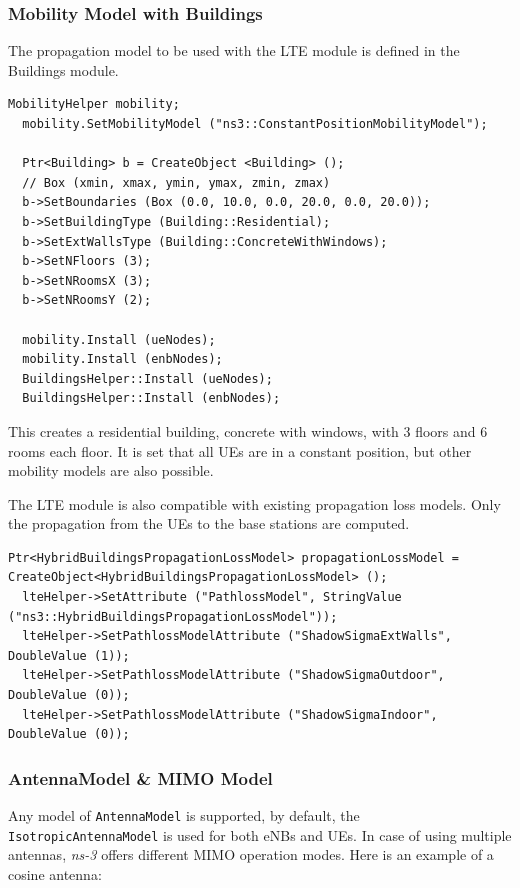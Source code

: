 \subsubsection{Mobility Model with Buildings}
The propagation model to be used with the LTE module is defined in the
Buildings module.

\begin{lstlisting}[language=myC++,caption={Mobility Model}, captionpos=b]
  MobilityHelper mobility;
  mobility.SetMobilityModel ("ns3::ConstantPositionMobilityModel");

  Ptr<Building> b = CreateObject <Building> ();
  // Box (xmin, xmax, ymin, ymax, zmin, zmax)
  b->SetBoundaries (Box (0.0, 10.0, 0.0, 20.0, 0.0, 20.0));
  b->SetBuildingType (Building::Residential);
  b->SetExtWallsType (Building::ConcreteWithWindows);
  b->SetNFloors (3);
  b->SetNRoomsX (3);
  b->SetNRoomsY (2);

  mobility.Install (ueNodes);
  mobility.Install (enbNodes);
  BuildingsHelper::Install (ueNodes);
  BuildingsHelper::Install (enbNodes);
\end{lstlisting}

This creates a residential building, concrete with windows, with 
3 floors and 6 rooms each floor. It is set that all UEs are in a 
constant position, but other mobility models are also possible.

The LTE module is also compatible with existing propagation loss models.
Only the propagation from the UEs to the base stations are computed.

\begin{lstlisting}[language=myC++,caption={Pathloss Model}, captionpos=b]
  Ptr<HybridBuildingsPropagationLossModel> propagationLossModel = CreateObject<HybridBuildingsPropagationLossModel> ();
  lteHelper->SetAttribute ("PathlossModel", StringValue ("ns3::HybridBuildingsPropagationLossModel"));
  lteHelper->SetPathlossModelAttribute ("ShadowSigmaExtWalls",   DoubleValue (1));
  lteHelper->SetPathlossModelAttribute ("ShadowSigmaOutdoor",    DoubleValue (0));
  lteHelper->SetPathlossModelAttribute ("ShadowSigmaIndoor",     DoubleValue (0));
\end{lstlisting}


\subsubsection{AntennaModel \& MIMO Model}
Any model of \texttt{AntennaModel} is supported, by default, the \texttt{IsotropicAntennaModel} is
used for both eNBs and UEs. In case of using multiple antennas, \textit{ns-3} offers different MIMO operation 
modes. Here is an example of a cosine antenna:

